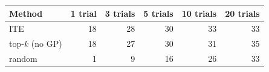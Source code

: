 \begin{tabular}{lrrrrr}
\toprule
Method & 1 trial & 3 trials & 5 trials & 10 trials & 20 trials \\
\midrule
ITE & 18 & 28 & 30 & 33 & 33 \\
top-$k$ (no GP) & 18 & 27 & 30 & 31 & 35 \\
random & 1 & 9 & 16 & 26 & 33 \\
\bottomrule
\end{tabular}
